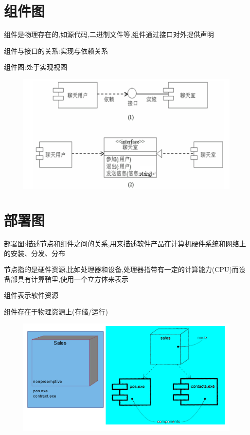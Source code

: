 \documentclass[UTF8,a4paper]{ctexart}
\begin{document}
\section{组件图}
组件是物理存在的,如源代码,二进制文件等,组件通过接口对外提供声明

组件与接口的关系:实现与依赖关系

组件图:处于实现视图

\begin{figure}[H]
  \centering
  \includegraphics[scale = 0.3]{assets/SoftwareEngineering_ab4cf.png}
\end{figure}

\section{部署图}
部署图:描述节点和组件之间的关系,用来描述软件产品在计算机硬件系统和网络上的安装、分发、分布

节点指的是硬件资源,比如处理器和设备,处理器指带有一定的计算能力(CPU)而设备部具有计算鞥里,使用一个立方体来表示

组件表示软件资源

组件存在于物理资源上(存储/运行)

\begin{figure}[H]
  \centering
  \includegraphics[scale = 0.3]{assets/SoftwareEngineering_8ff94.png}
\end{figure}
\end{document}
